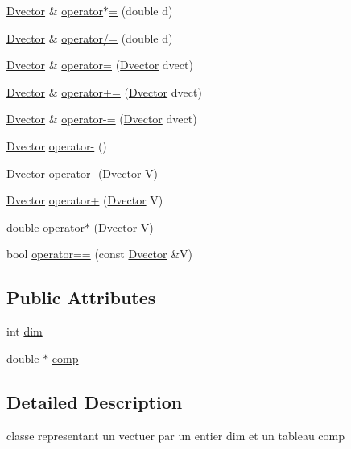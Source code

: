 \begin{DoxyCompactItemize}
\item 
\hyperlink{class_dvector}{Dvector} \& \hyperlink{class_dvector_a5ee50fe9dbf70d63a6d4b58857af5b03}{operator$\ast$=} (double d)
\item 
\hyperlink{class_dvector}{Dvector} \& \hyperlink{class_dvector_a270a1f8310b7fb335229578346607ce3}{operator/=} (double d)
\item 
\hyperlink{class_dvector}{Dvector} \& \hyperlink{class_dvector_abce9f39600029474f310a53bfe620228}{operator=} (\hyperlink{class_dvector}{Dvector} dvect)
\item 
\hyperlink{class_dvector}{Dvector} \& \hyperlink{class_dvector_adeac3055dcb97cf3ad7bc1c330378c30}{operator+=} (\hyperlink{class_dvector}{Dvector} dvect)
\item 
\hyperlink{class_dvector}{Dvector} \& \hyperlink{class_dvector_a77547a8c4fc3227ae1769ce3a756cd15}{operator-\/=} (\hyperlink{class_dvector}{Dvector} dvect)
\item 
\hyperlink{class_dvector}{Dvector} \hyperlink{class_dvector_a402617afbca77199f537110a8efc0e10}{operator-\/} ()
\item 
\hyperlink{class_dvector}{Dvector} \hyperlink{class_dvector_a1fe5428a89f19322ed4d624471746eda}{operator-\/} (\hyperlink{class_dvector}{Dvector} V)
\item 
\hyperlink{class_dvector}{Dvector} \hyperlink{class_dvector_a5a9f75789493aa9280e7440977a520cd}{operator+} (\hyperlink{class_dvector}{Dvector} V)
\item 
double \hyperlink{class_dvector_a214b13de03a88115c16233a8297c0227}{operator$\ast$} (\hyperlink{class_dvector}{Dvector} V)
\item 
bool \hyperlink{class_dvector_a5beafb253312c52d8ba44939a5e9b18d}{operator==} (const \hyperlink{class_dvector}{Dvector} \&V)
\end{DoxyCompactItemize}
\subsection*{Public Attributes}
\begin{DoxyCompactItemize}
\item 
int \hyperlink{class_dvector_aaa143e03a245cdc68eb1bfa731e36cdc}{dim}
\item 
double $\ast$ \hyperlink{class_dvector_a6f695602bfc3117dc6180b5c3212aa25}{comp}
\end{DoxyCompactItemize}


\subsection{Detailed Description}
classe representant un vectuer par un entier dim et un tableau comp 

